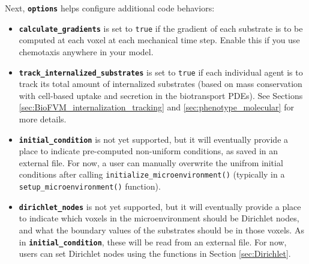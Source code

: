 \documentclass[12pt]{article}
\newcommand{\smallcode}[1]{\textbf{\texttt{#1}}}
\begin{document}
Next, \smallcode{options} helps configure additional code behaviors: 
\begin{itemize}
\item \smallcode{calculate\_gradients} is set to \verb+true+ if the gradient of each substrate 
is to be computed at each voxel at each mechanical time step. Enable this if you use 
chemotaxis anywhere in your model. 
\item \smallcode{track\_internalized\_substrates} is set to 
\verb+true+ if each individual agent is to track its total amount of internalized substrates 
(based on mass conservation with cell-based uptake and secretion in the biotransport PDEs). 
See Sections \ref{sec:BioFVM_internalization_tracking} and 
\ref{sec:phenotype_molecular} for more details. 

\item \smallcode{initial\_condition} is not yet supported, but it will eventually provide a 
place to indicate pre-computed non-uniform conditions, as saved in an external file. For 
now, a user can manually overwrite the unifrom initial conditions after calling 
\verb+initialize_microenvironment()+ (typically in a \verb+setup_microenvironment()+ function). 

\item \smallcode{dirichlet\_nodes} is not yet supported, but it will eventually provide a 
place to indicate which voxels in the microenvironment should be Dirichlet nodes, and 
what the boundary values of the substrates should be in those voxels. As in 
\smallcode{initial\_condition}, these will be read from an external file. For now, 
users can set Dirichlet nodes using the functions in Section 
\ref{sec:Dirichlet}. 

\end{itemize}
\end{document}

